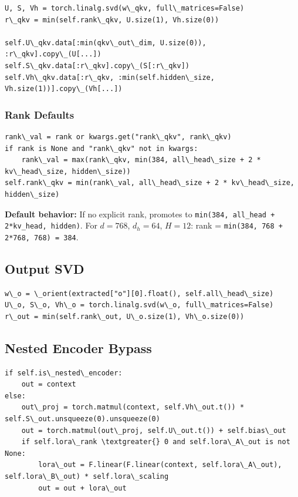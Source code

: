 \begin{lstlisting}
U, S, Vh = torch.linalg.svd(w\_qkv, full\_matrices=False)
r\_qkv = min(self.rank\_qkv, U.size(1), Vh.size(0))

self.U\_qkv.data[:min(qkv\_out\_dim, U.size(0)), :r\_qkv].copy\_(U[...])
self.S\_qkv.data[:r\_qkv].copy\_(S[:r\_qkv])
self.Vh\_qkv.data[:r\_qkv, :min(self.hidden\_size, Vh.size(1))].copy\_(Vh[...])
\end{lstlisting}

\subsubsection{Rank Defaults}

\begin{lstlisting}
rank\_val = rank or kwargs.get("rank\_qkv", rank\_qkv)
if rank is None and "rank\_qkv" not in kwargs:
    rank\_val = max(rank\_qkv, min(384, all\_head\_size + 2 * kv\_head\_size, hidden\_size))
self.rank\_qkv = min(rank\_val, all\_head\_size + 2 * kv\_head\_size, hidden\_size)
\end{lstlisting}

\textbf{Default behavior:} If no explicit rank, promotes to \texttt{min(384, all\_head + 2*kv\_head, hidden)}. 
For $d = 768$, $d_h = 64$, $H = 12$: rank = \texttt{min(384, 768 + 2*768, 768) = 384}.

\subsection{Output SVD}

\begin{lstlisting}
w\_o = \_orient(extracted["o"][0].float(), self.all\_head\_size)
U\_o, S\_o, Vh\_o = torch.linalg.svd(w\_o, full\_matrices=False)
r\_out = min(self.rank\_out, U\_o.size(1), Vh\_o.size(0))
\end{lstlisting}

\subsection{Nested Encoder Bypass}

\begin{lstlisting}
if self.is\_nested\_encoder:
    out = context
else:
    out\_proj = torch.matmul(context, self.Vh\_out.t()) * self.S\_out.unsqueeze(0).unsqueeze(0)
    out = torch.matmul(out\_proj, self.U\_out.t()) + self.bias\_out
    if self.lora\_rank \textgreater{} 0 and self.lora\_A\_out is not None:
        lora\_out = F.linear(F.linear(context, self.lora\_A\_out), self.lora\_B\_out) * self.lora\_scaling
        out = out + lora\_out
\end{lstlisting}

